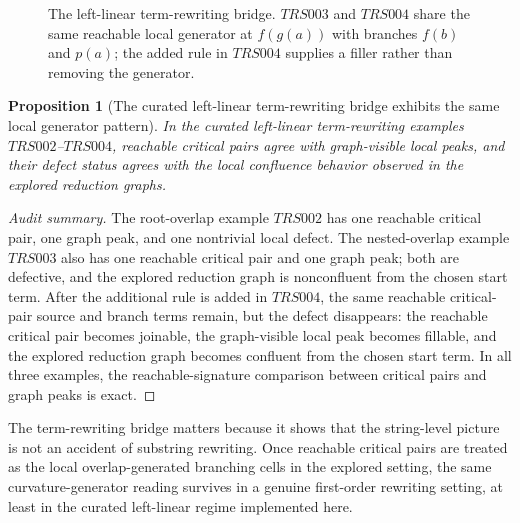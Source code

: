 \documentclass[11pt]{article}
\numberwithin{equation}{section}
\newtheorem{proposition}[theorem]{Proposition}
\theoremstyle{definition}
\theoremstyle{remark}
\begin{document}
\begin{figure}[t]
    \centering
    \caption{The left-linear term-rewriting bridge. $TRS003$ and $TRS004$ share the same reachable local generator at $f(g(a))$ with branches $f(b)$ and $p(a)$; the added rule in $TRS004$ supplies a filler rather than removing the generator.}
    \label{fig:trs-nested-overlap-pair}
\end{figure}

\begin{proposition}[The curated left-linear term-rewriting bridge exhibits the same local generator pattern]
\label{prop:trs-critical-pairs-as-curvature-generators}
In the curated left-linear term-rewriting examples $TRS002$--$TRS004$, reachable critical pairs agree with graph-visible local peaks, and their defect status agrees with the local confluence behavior observed in the explored reduction graphs.
\end{proposition}

\begin{proof}[Audit summary]
The root-overlap example $TRS002$ has one reachable critical pair, one graph peak, and one nontrivial local defect. The nested-overlap example $TRS003$ also has one reachable critical pair and one graph peak; both are defective, and the explored reduction graph is nonconfluent from the chosen start term. After the additional rule is added in $TRS004$, the same reachable critical-pair source and branch terms remain, but the defect disappears: the reachable critical pair becomes joinable, the graph-visible local peak becomes fillable, and the explored reduction graph becomes confluent from the chosen start term. In all three examples, the reachable-signature comparison between critical pairs and graph peaks is exact.
\end{proof}

The term-rewriting bridge matters because it shows that the string-level picture is not an accident of substring rewriting. Once reachable critical pairs are treated as the local overlap-generated branching cells in the explored setting, the same curvature-generator reading survives in a genuine first-order rewriting setting, at least in the curated left-linear regime implemented here.
\end{document}
